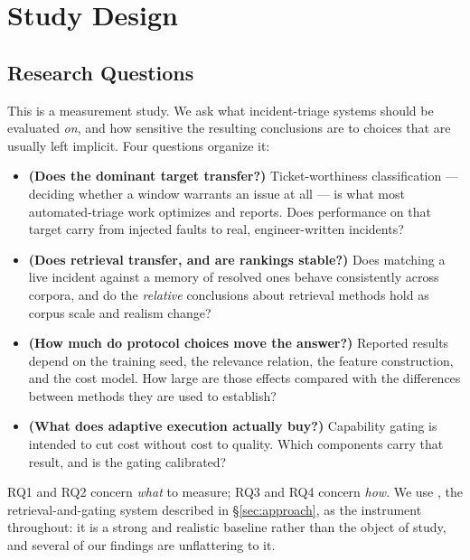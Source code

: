 \section{Study Design}
\label{sec:setup}

\subsection{Research Questions}
\label{sec:setup-rqs}

This is a measurement study. We ask what incident-triage systems should be
evaluated \emph{on}, and how sensitive the resulting conclusions are to choices
that are usually left implicit. Four questions organize it:

\begin{itemize}
  \item[\textbf{RQ1}] \textbf{(Does the dominant target transfer?)}
  Ticket-worthiness classification --- deciding whether a window warrants an
  issue at all --- is what most automated-triage work optimizes and reports.
  Does performance on that target carry from injected faults to real,
  engineer-written incidents?

  \item[\textbf{RQ2}] \textbf{(Does retrieval transfer, and are rankings
  stable?)} Does matching a live incident against a memory of resolved ones
  behave consistently across corpora, and do the \emph{relative} conclusions
  about retrieval methods hold as corpus scale and realism change?

  \item[\textbf{RQ3}] \textbf{(How much do protocol choices move the answer?)}
  Reported results depend on the training seed, the relevance relation, the
  feature construction, and the cost model. How large are those effects
  compared with the differences between methods they are used to establish?

  \item[\textbf{RQ4}] \textbf{(What does adaptive execution actually buy?)}
  Capability gating is intended to cut cost without cost to quality. Which
  components carry that result, and is the gating calibrated?
\end{itemize}

RQ1 and RQ2 concern \emph{what} to measure; RQ3 and RQ4 concern \emph{how}. We
use \sys{}, the retrieval-and-gating system described in \S\ref{sec:approach},
as the instrument throughout: it is a strong and realistic baseline rather than
the object of study, and several of our findings are unflattering to it.

